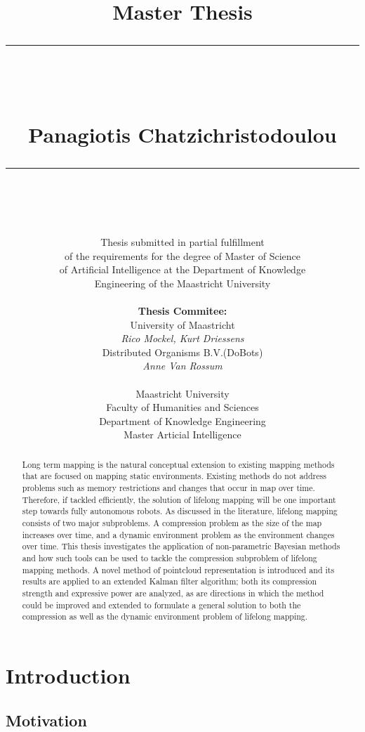 \documentclass[twoside,hidelinks]{article}
\title{
\Huge{Master Thesis} \\
\noindent\rule{4cm}{0.4pt} \\
\vspace{5mm}
\huge{\selectfont{Towards lifelong mapping in pointclouds}}
\vspace{5mm} \\
\normalsize Panagiotis Chatzichristodoulou \\
\noindent\rule{4cm}{0.4pt} \\
\vspace{5mm}
\fontsize{24pt}{10pt}{Master Thesis DKE 09-16 }} %
\author{
\normalsize Thesis submitted in partial fulfillment\\
\normalsize  of the requirements for the degree of Master of Science \\
\normalsize of Artificial Intelligence at the Department of Knowledge \\
\normalsize  Engineering of the Maastricht University \\
\vspace{5mm} \\
\normalsize \textbf{Thesis Commitee:} \\ 
\normalsize University of Maastricht \\ %
\normalsize \textit{Rico Mockel, Kurt Driessens} \\
\normalsize Distributed Organisms B.V.(DoBots)\\
\normalsize \textit{Anne Van Rossum} \\
\vspace{0mm} \\
\normalsize Maastricht University \\
\normalsize Faculty of Humanities and Sciences \\ 
\normalsize Department of Knowledge Engineering \\
\normalsize Master Articial Intelligence \\
}
\begin{document}
\maketitle %

\thispagestyle{fancy} %

\newpage
\begin{abstract}

\noindent Long term mapping is the natural conceptual extension to existing mapping methods that are focused on mapping static environments.
Existing methods do not address problems such as memory restrictions and changes that occur in map over time. Therefore, if tackled efficiently, the solution of lifelong mapping will be one important step towards fully autonomous robots.
As discussed in the literature, lifelong mapping consists of two major subproblems. A compression problem as the size of the map increases over time, and a dynamic environment problem as the environment changes over time. This thesis investigates the application of non-parametric Bayesian methods and how such tools can be used to tackle the compression subproblem of lifelong mapping methods. A novel method of pointcloud representation is introduced and its results are applied to an extended Kalman filter algorithm; both its compression strength and expressive power are analyzed, as are directions in which the method could be improved and extended to formulate a general solution to both the compression as well as the dynamic environment problem of lifelong mapping.


\end{abstract}

 
\tableofcontents
\listoffigures
 
 

\newpage


\section{Introduction}
\label{sec:Intro}

\subsection{Motivation}
\end{document}
